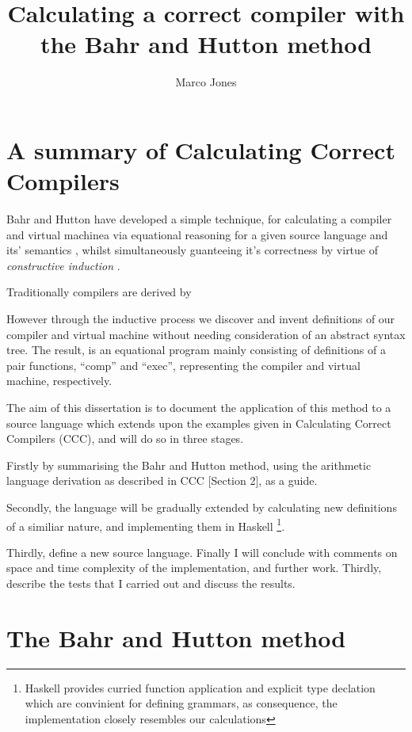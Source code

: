 \documentclass {article}
\title{Calculating a correct compiler with the Bahr and Hutton method}
\author{Marco Jones}
\date{}
\begin{document}
\maketitle

\newcommand{\BH}{Bahr and Hutton }

\section{A summary of Calculating Correct Compilers}
\BH have developed a simple technique, for
calculating a compiler and virtual machinea via equational reasoning
for a given source language and its' semantics \cite{bandh}, 
whilst simultaneously guanteeing it's correctness by virtue 
of \emph{constructive induction} \cite{backhouse}.

Traditionally compilers are derived by %

However through the inductive process we discover and invent definitions
of our compiler and virtual machine without needing consideration of an 
abstract syntax tree.
The result, is an equational program mainly consisting of
definitions of a pair functions,  ``comp'' and ``exec'',
representing the compiler and virtual machine, respectively.

The aim of this dissertation is to document the
application of this method
to a source language which extends upon the examples given in
Calculating Correct Compilers (CCC),
 and will do so in three stages.

Firstly by summarising the \BH method,
using the arithmetic language derivation as described in
CCC [Section 2], as a guide.

Secondly, the language will be gradually extended
by calculating new definitions of a similiar nature,
and implementing them in Haskell
\footnote{Haskell provides curried function application
		and explicit type declation which are
		convinient for defining grammars,
		as consequence, the implementation closely
		resembles our calculations}.

Thirdly, define a new source language.
Finally I will conclude with comments on space and time complexity
of the implementation, and further work.
Thirdly, describe the tests that I carried out and discuss the results.


\section{The Bahr and Hutton method}
\end{document}
